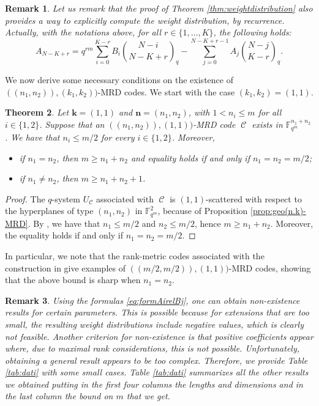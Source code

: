 \documentclass[11pt]{amsart}
\DeclareMathOperator{\C}{\mathcal{C}}
\newtheorem{theorem}{Theorem}[section]
\newtheorem{remark}[theorem]{Remark}
\newcommand{\fqm}{\mathbb{F}_{q^m}}
\begin{document}
\begin{remark}
Let us remark that the proof of Theorem \ref{thm:weightdistribution} also provides a way to explicitly compute the weight distribution, by recurrence. Actually, with the notations above, for all $r\in \{1,\ldots,K\}$, the following holds:
\begin{equation}\label{eq:formAirelBj}
A_{N-K+r}
=q^{rm}\sum_{i=0}^{K-r}B_i\binom{N-i}{N-K+r}_q-\sum_{j=0}^{N-K+r-1}A_j\binom{N-j}{K-r}_q.\end{equation}
\end{remark}

We now derive some necessary conditions on the existence of $((n_1,n_2)),(k_1,k_2))$-MRD codes.
We start with the case $(k_1,k_2)=(1,1)$.

\begin{theorem}\label{thm:case(1,1)bound}
    Let ${\mathbf k}=(1,1)$ and  ${\mathbf n}=(n_1,n_2)$, with $1<n_i\leq m$ for all $i\in \{1,2\}$.
    Suppose that an $((n_1,n_2)),(1,1))$-MRD code $\C$ exists in $\fqm^{n_1+n_2}$.
    We have that $n_i\leq m/2$ for every $i \in \{1,2\}$. Moreover,
    \begin{itemize}
        \item if $n_1=n_2$, then $m\geq n_1+n_2$ and equality holds if and only if $n_1=n_2=m/2$;
        \item if $n_1\ne n_2$, then $m\geq n_1+n_2+1$.
    \end{itemize}
\end{theorem}
\begin{proof}
    The $q$-system $U_{\C}$ associated with $\C$ is $(1,1)$-scattered with respect to the hyperplanes of type $(n_1,n_2)$ in $\fqm^2$, because of Proposition \ref{prop:geo(n.k)-MRD}.
    By \cite[Theorem 4.4]{napolitano2022linear}, we have that $n_1\leq m/2$ and $n_2\leq m/2$, hence $m\geq n_1+n_2$.
    Moreover, the equality holds if and only if $n_1=n_2=m/2$.
\end{proof}

In particular, we note that the rank-metric codes associated with the construction in \cite[Corollary 4.7]{napolitano2022linear} give examples of $((m/2,m/2)),(1,1))$-MRD codes, showing that the above bound is sharp when $n_1=n_2$.

\begin{remark}
Using the formulas \eqref{eq:formAirelBj}, one can obtain non-existence results for certain parameters. This is possible because for extensions that are too small, the resulting weight distributions include negative values, which is clearly not feasible. Another criterion for non-existence is that positive coefficients appear where, due to maximal rank considerations, this is not possible.
Unfortunately, obtaining a general result appears to be too complex. Therefore, we provide Table \ref{tab:dati} with some small cases. 
Table \ref{tab:dati} summarizes all the other results we obtained putting in the first four columns the lengths and dimensions and in the last column the bound on $m$ that we get. 
\end{remark}
\end{document}
